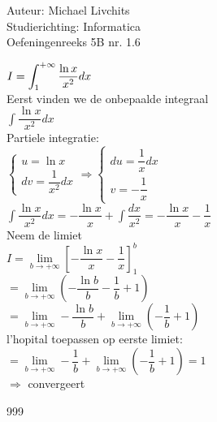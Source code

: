 \documentclass[a4paper]{article}
\newcommand{\dint}{\displaystyle\int}
\begin{document}
  
\noindent \large Auteur: Michael Livchits \\
\noindent \large Studierichting: Informatica\\
\noindent \large Oefeningenreeks 5B nr. 1.6\\

\medskip

\normalsize

$I = \displaystyle\dint_{1}^{+\infty} \dfrac{\ln x}{x^2}dx$\\

Eerst vinden we de onbepaalde integraal\\

$\displaystyle\int \dfrac{\ln x}{x^2}dx$\\

Partiele integratie:\\

$\left\{
    \begin{array}{l}
        u =  \ln x \\
        dv = \dfrac{1}{x^2}dx
    \end{array}
\right .
\Rightarrow
\left\{
    \begin{array}{l}
        du = \dfrac{1}{x}dx \\
        v = -\dfrac{1}{x}
    \end{array}
\right .$\\

$\displaystyle\int \dfrac{\ln x}{x^2}dx = -\dfrac{\ln x}{x} + \displaystyle\int\dfrac{dx}{x^2} = -\dfrac{\ln x}{x} - \dfrac{1}{x}$\\

Neem de limiet\\

$I = \lim\limits_{b\rightarrow +\infty}\left[-\dfrac{\ln x}{x} - \dfrac{1}{x}\right]_{1}^{b}$\\

$= \lim\limits_{b\rightarrow +\infty}\left(-\dfrac{\ln b}{b} - \dfrac{1}{b} + 1\right)$\\

$= \lim\limits_{b\rightarrow +\infty}-\dfrac{\ln b}{b} +  \lim\limits_{b\rightarrow +\infty}\left(- \dfrac{1}{b} + 1\right)$\\

l'hopital toepassen op eerste limiet:\\

$= \lim\limits_{b\rightarrow +\infty}-\dfrac{1}{b} +  \lim\limits_{b\rightarrow +\infty}\left(- \dfrac{1}{b} + 1\right) = 1$\\

$\Rightarrow$ convergeert\\

\begin{thebibliography}{999}
\end{thebibliography}
\end{document}
